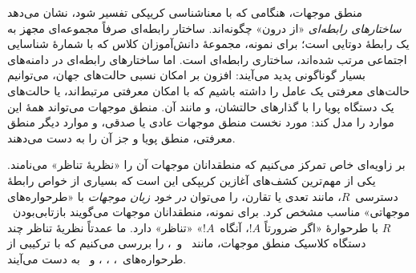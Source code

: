 \documentclass[../../../include/open-logic-section]{subfiles}
\begin{document}
منطق موجهات، هنگامی که با معناشناسی کریپکی تفسیر شود، نشان می‌دهد
\emph{ساختارهای رابطه‌ای} «از درون» چگونه‌اند. ساختار رابطه‌ای صرفاً
مجموعه‌ای مجهز به یک رابطهٔ دوتایی است؛ برای نمونه، مجموعهٔ دانش‌آموزان
کلاس که با شمارهٔ شناسایی اجتماعی مرتب شده‌اند، ساختاری رابطه‌ای است.
اما ساختارهای رابطه‌ای در دامنه‌های بسیار گوناگونی پدید می‌آیند: افزون
بر امکان نسبی حالت‌های جهان، می‌توانیم حالت‌های معرفتی یک عامل را داشته
باشیم که با امکان معرفتی مرتبط‌اند، یا حالت‌های یک دستگاه پویا را با
گذارهای حالتشان، و مانند آن. منطق موجهات می‌تواند همهٔ این موارد را
مدل کند: مورد نخست منطق موجهات عادی یا صدقی، و موارد دیگر منطق معرفتی،
منطق پویا و جز آن را به دست می‌دهند.

بر زاویه‌ای خاص تمرکز می‌کنیم که منطقدانان موجهات آن را «نظریهٔ تناظر»
می‌نامند. یکی از مهم‌ترین کشف‌های آغازین کریپکی این است که بسیاری از
خواص رابطهٔ دسترسی~$R$، مانند تعدی یا تقارن، را می‌توان \emph{در خود
زبان موجهات} با «طرحواره‌های موجهاتی» مناسب مشخص کرد. برای نمونه،
منطقدانان موجهات می‌گویند بازتابی‌بودن~$R$ با طرحوارهٔ «اگر ضرورتاً
$!A$، آنگاه~$!A$» «تناظر» دارد. ما عمدتاً نظریهٔ تناظر چند دستگاه
کلاسیک منطق موجهات، مانند~ و~، را بررسی می‌کنیم که با
ترکیبی از طرحواره‌های~، ، ،  و~ به دست
می‌آیند.
\end{document}
